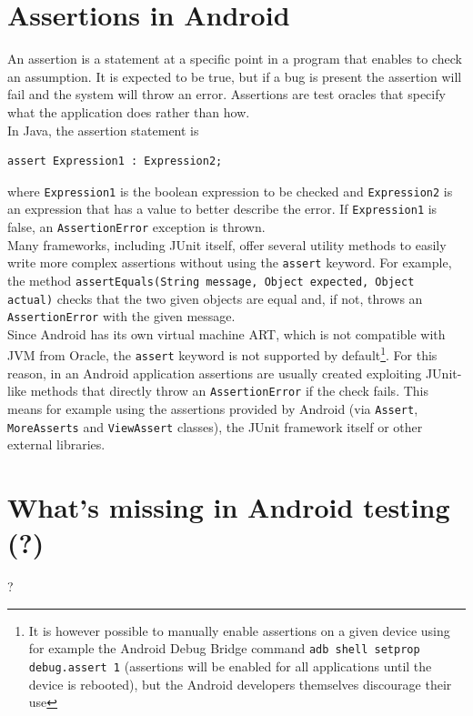 \documentclass[11pt,a4paper,notitlepage]{article}
\begin{document}
\section{Assertions in Android}
An assertion is a statement at a specific point in a program that enables to check an assumption. It is expected to be true, but if a bug is present the assertion will fail and the system will throw an error. Assertions are test oracles that specify what the application does rather than how.
\bigskip \\
In Java, the assertion statement is
\begin{lstlisting}
assert Expression1 : Expression2;
\end{lstlisting}
where \texttt{Expression1} is the boolean expression to be checked and \texttt{Expression2} is an expression that has a value to better describe the error. If \texttt{Expression1} is false, an \texttt{AssertionError} exception is thrown.\bigskip \\
Many frameworks, including JUnit itself, offer several utility methods to easily write more complex assertions without using the \texttt{assert} keyword. For example, the method \texttt{assertEquals(String message, Object expected, Object actual)} checks that the two given objects are equal and, if not, throws an \texttt{AssertionError} with the given message.\bigskip \\
Since Android has its own virtual machine ART, which is not compatible with JVM from Oracle, the \texttt{assert} keyword is not supported by default\footnote{It is however possible to manually enable assertions on a given device using for example the Android Debug Bridge command \texttt{adb shell setprop debug.assert 1} (assertions will be enabled for all applications until the device is rebooted), but the Android developers themselves discourage their use}. For this reason, in an Android application assertions are usually created exploiting JUnit-like methods that directly throw an \texttt{AssertionError} if the check fails. This means for example using the assertions provided by Android (via \texttt{Assert}, \texttt{MoreAsserts} and \texttt{ViewAssert} classes), the JUnit framework itself or other external libraries.

\section{What's missing in Android testing (?)}
?

\end{document}
